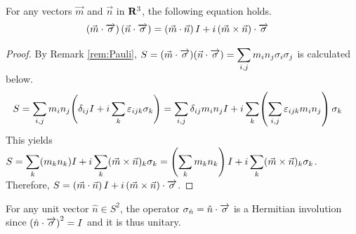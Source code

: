 \begin{proposition}\label{prop:Pauli}
	For any vectors $\vec{m}$ and $\vec{n}$ in $\mathbf{R}^3$, the following equation holds.
	\begin{align*}
		\left(\vec{m} \cdot \overrightarrow{\sigma}\right) (\vec{n} \cdot \overrightarrow{\sigma}) & =
		\left(\vec{m} \cdot \vec{n}\right) I + i \left(\vec{m} \times \vec{n}\right) \cdot \overrightarrow{\sigma}
	\end{align*}
\end{proposition}
\begin{proof}
	By Remark \ref{rem:Pauli}, $\displaystyle S = (\vec{m} \cdot \overrightarrow{\sigma}) (\vec{n} \cdot \overrightarrow{\sigma}) = \sum_{i,j} m_i n_j \sigma_i \sigma_j$ is calculated below.
	\begin{align*}
		S & = \sum_{i, j} m_i n_j \!\left(\delta_{ij} I + i \sum_k \varepsilon_{ijk} \sigma_k\right) = \sum_{i, j} \delta_{ij} m_i n_j I + i \sum_{k} \!\left(\sum_{i,j} \varepsilon_{ijk} m_i n_j\right) \sigma_k
	\end{align*}
	This yields $\displaystyle S = \sum_{k} (m_k n_k) I + i \sum_{k} (\vec{m} \times \vec{n})_k \sigma_k = \left(\sum_{k} m_k n_k\right) I + i \sum_{k} (\vec{m} \times \vec{n})_k \sigma_k$.
	Therefore, $\displaystyle S  = \left(\vec{m} \cdot \vec{n}\right) I + i \left(\vec{m} \times \vec{n}\right) \cdot \overrightarrow{\sigma}$.
\end{proof}

For any unit vector $\hat{n} \in S^2$, the operator $\sigma_{\hat{n}} = \hat{n} \cdot \overrightarrow{\sigma}$ is a Hermitian involution since $\left(\hat{n} \cdot \overrightarrow{\sigma}\right)^2 = I$ and it is thus unitary.

